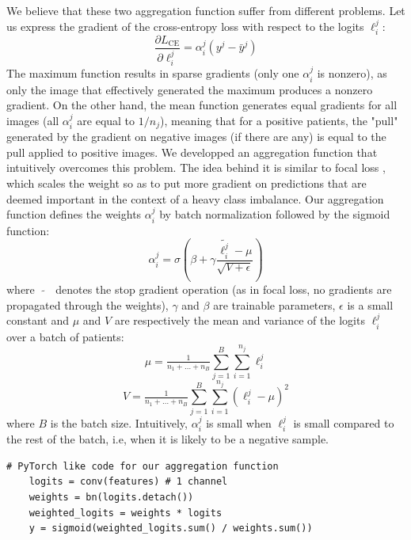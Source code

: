 \documentclass[final]{cvpr}
\begin{document}
We believe that these two aggregation function suffer from different problems. Let us express the gradient of the cross-entropy loss with respect to the logits $\ell_i^j$:
$$\frac{\partial L_{\text{CE}}}{\partial \ell_i^j} = \alpha_i^j \left(y^j - \bar{y}^j\right)$$
The maximum function results in sparse gradients (only one $\alpha_i^j$ is nonzero), as only the image that effectively generated the maximum produces a nonzero gradient. On the other hand, the mean function generates equal gradients for all images (all $\alpha_i^j$ are equal to $1/n_j$), meaning that for a positive patients, the "pull" generated by the gradient on negative images (if there are any) is equal to the pull applied to positive images. We developped an aggregation function that intuitively overcomes this problem.
The idea behind it is similar to focal loss \cite{focal}, which scales the weight so as to put more gradient on predictions that are deemed important in the context of a heavy class imbalance.
Our aggregation function defines the weights $\alpha_i^j$ by batch normalization \cite{bn} followed by the sigmoid function:
$$ \alpha_i^j = \sigma\left(\beta + \gamma \frac{\widetilde{\ell_i^j} - \mu}{\sqrt{V+\epsilon}}\right) $$
where $\; \widetilde{\text{ }} \;$ denotes the stop gradient operation (as in focal loss, no gradients are propagated through the weights), $\gamma$ and $\beta$ are trainable parameters, $\epsilon$ is a small constant and $\mu$ and $V$ are respectively the mean and variance of the logits $\ell_i^j$ over a batch of patients:
$$\mu = \tfrac 1 {n_1+\dots+n_B} \sum_{j=1}^{B} \sum_{i=1}^{n_j} \ell_i^j$$
$$V = \tfrac 1 {n_1+\dots+n_B} \sum_{j=1}^{B} \sum_{i=1}^{n_j} \left(\ell_i^j - \mu \right)^2$$
where $B$ is the batch size. Intuitively, $\alpha_i^j$ is small when $\ell_i^j$ is small compared to the rest of the batch, i.e, when it is likely to be a negative sample.

\begin{Verbatim}[fontsize=\footnotesize, samepage=true]
	# PyTorch like code for our aggregation function
	logits = conv(features) # 1 channel
	weights = bn(logits.detach())
	weighted_logits = weights * logits
	y = sigmoid(weighted_logits.sum() / weights.sum())
\end{Verbatim}
\end{document}
